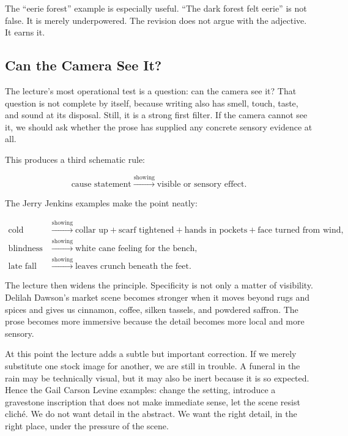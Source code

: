 The ``eerie forest'' example is especially useful. ``The dark forest felt eerie'' is not false. It is merely underpowered. The revision does not argue with the adjective. It earns it.

\subsection{Can the Camera See It?}

The lecture's most operational test is a question: can the camera see it? That question is not complete by itself, because writing also has smell, touch, taste, and sound at its disposal. Still, it is a strong first filter. If the camera cannot see it, we should ask whether the prose has supplied any concrete sensory evidence at all.

This produces a third schematic rule:

\begin{equation}
\text{cause statement} \xrightarrow{\text{showing}} \text{visible or sensory effect}.
\end{equation}

The Jerry Jenkins examples make the point neatly:

\begin{align}
\text{cold}
&\xrightarrow{\text{showing}}
\text{collar up} + \text{scarf tightened} + \text{hands in pockets} + \text{face turned from wind},\\
\text{blindness}
&\xrightarrow{\text{showing}}
\text{white cane feeling for the bench},\\
\text{late fall}
&\xrightarrow{\text{showing}}
\text{leaves crunch beneath the feet}.
\end{align}

The lecture then widens the principle. Specificity is not only a matter of visibility. Delilah Dawson's market scene becomes stronger when it moves beyond rugs and spices and gives us cinnamon, coffee, silken tassels, and powdered saffron. The prose becomes more immersive because the detail becomes more local and more sensory.

At this point the lecture adds a subtle but important correction. If we merely substitute one stock image for another, we are still in trouble. A funeral in the rain may be technically visual, but it may also be inert because it is so expected. Hence the Gail Carson Levine examples: change the setting, introduce a gravestone inscription that does not make immediate sense, let the scene resist cliché. We do not want detail in the abstract. We want the right detail, in the right place, under the pressure of the scene.

